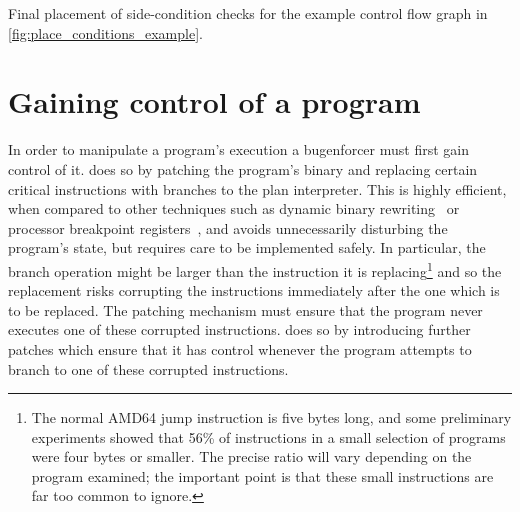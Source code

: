 \begin{sanefig}
  \caption{Final placement of side-condition checks for the example
    control flow graph in \autoref{fig:place_conditions_example}.}
  \label{fig:place_conditions_example:result}
\end{sanefig}

\section{Gaining control of a program}
\label{sect:enforce:gain_control}

In order to manipulate a program's execution a \gls{bugenforcer} must
first gain control of it.  {\Implementation} does so by patching the
program's binary and replacing certain critical instructions with
branches to the \gls{plan interpreter}.  This is highly efficient,
when compared to other techniques such as dynamic binary
rewriting~\cite{Luk2005,Nethercote2007} or processor breakpoint
registers~\cite[Chapter 16.2: Debug Registers]{Intel2009}, and avoids
unnecessarily disturbing the program's state, but requires care to be
implemented safely.  In particular, the branch operation might be
larger than the instruction it is replacing\footnote{The normal AMD64
  jump instruction is five bytes long, and some preliminary
  experiments showed that 56\% of instructions in a small selection of
  programs were four bytes or smaller.  The precise ratio will vary
  depending on the program examined; the important point is that these
  small instructions are far too common to ignore.} and so the
replacement risks corrupting the instructions immediately after the
one which is to be replaced.  The patching mechanism must ensure that
the program never executes one of these corrupted instructions.
{\Implementation} does so by introducing further patches which ensure
that it has control whenever the program attempts to branch to one of
these corrupted instructions.


